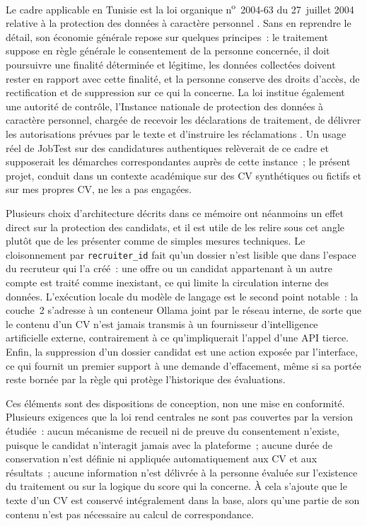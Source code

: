 Le cadre applicable en Tunisie est la loi organique n\textsuperscript{o}~2004-63 du 27~juillet 2004 relative à la protection des données à caractère personnel \cite{loi2004_63}. Sans en reprendre le détail, son économie générale repose sur quelques principes~: le traitement suppose en règle générale le consentement de la personne concernée, il doit poursuivre une finalité déterminée et légitime, les données collectées doivent rester en rapport avec cette finalité, et la personne conserve des droits d'accès, de rectification et de suppression sur ce qui la concerne. La loi institue également une autorité de contrôle, l'Instance nationale de protection des données à caractère personnel, chargée de recevoir les déclarations de traitement, de délivrer les autorisations prévues par le texte et d'instruire les réclamations \cite{inpdp}. Un usage réel de JobTest sur des candidatures authentiques relèverait de ce cadre et supposerait les démarches correspondantes auprès de cette instance~; le présent projet, conduit dans un contexte académique sur des CV synthétiques ou fictifs et sur mes propres CV, ne les a pas engagées.

Plusieurs choix d'architecture décrits dans ce mémoire ont néanmoins un effet direct sur la protection des candidats, et il est utile de les relire sous cet angle plutôt que de les présenter comme de simples mesures techniques. Le cloisonnement par \texttt{recruiter\_id} fait qu'un dossier n'est lisible que dans l'espace du recruteur qui l'a créé~: une offre ou un candidat appartenant à un autre compte est traité comme inexistant, ce qui limite la circulation interne des données. L'exécution locale du modèle de langage est le second point notable~: la couche~2 s'adresse à un conteneur Ollama joint par le réseau interne, de sorte que le contenu d'un CV n'est jamais transmis à un fournisseur d'intelligence artificielle externe, contrairement à ce qu'impliquerait l'appel d'une API tierce. Enfin, la suppression d'un dossier candidat est une action exposée par l'interface, ce qui fournit un premier support à une demande d'effacement, même si sa portée reste bornée par la règle qui protège l'historique des évaluations.

Ces éléments sont des dispositions de conception, non une mise en conformité. Plusieurs exigences que la loi rend centrales ne sont pas couvertes par la version étudiée~: aucun mécanisme de recueil ni de preuve du consentement n'existe, puisque le candidat n'interagit jamais avec la plateforme~; aucune durée de conservation n'est définie ni appliquée automatiquement aux CV et aux résultats~; aucune information n'est délivrée à la personne évaluée sur l'existence du traitement ou sur la logique du score qui la concerne. À cela s'ajoute que le texte d'un CV est conservé intégralement dans la base, alors qu'une partie de son contenu n'est pas nécessaire au calcul de correspondance.

